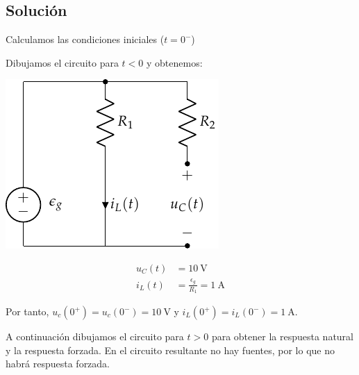 \documentclass[12pt]{article}
\begin{document}
\subsection*{Solución}

Calculamos las condiciones iniciales ($t = 0^-$)

Dibujamos el circuito para $t < 0$ y obtenemos:

\begin{minipage}{0.3\textwidth}
\includegraphics{figs/FM_4_8_t0-}
\end{minipage}
\begin{minipage}{0.7\textwidth}
  \begin{align*}
    u_C(t) &= \SI{10}{\volt}\\
    i_L(t) &= \frac{\epsilon_g}{R_1} = \SI{1}{\ampere}
  \end{align*}
\end{minipage}

\bigskip
Por tanto, $u_c(0^+) = u_c(0^-) = \SI{10}{\volt}$ y $i_L(0^+) = i_L(0^-) = \SI{1}{\ampere}$.

A continuación dibujamos el circuito para $t > 0$ para obtener la respuesta natural y la respuesta forzada. En el circuito resultante no hay fuentes, por lo que no habrá respuesta forzada.
\end{document}
